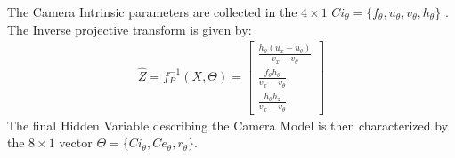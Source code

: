 The Camera Intrinsic parameters are collected in the $4\times1$
$Ci_{\theta}=\{ f_{\theta}, u_{\theta}, v_{\theta}, h_{\theta} \}$ .\\
The Inverse projective transform is given by:
\begin{eqnarray} \label{eqn: Inverse Perspective Projection}
\hat{Z} = f_P^{-1}(X,\Theta)=
 \left[
\begin{array}{c}
\frac{ h_{\theta} (u_x-u_{\theta}) }{ v_x-v_{\theta}} \\
\frac{ f_{\theta} h_{\theta} }{v_x-v_{\theta}} \\
\frac{ h_{\theta} h_z}{v_x-v_{\theta}}
\end{array}
\right]
\end{eqnarray}
The final Hidden Variable describing the Camera Model is then characterized by the
$8\times1$ vector $\Theta=\{ Ci_{\theta},Ce_{\theta},r_{\theta}\}$.\\

